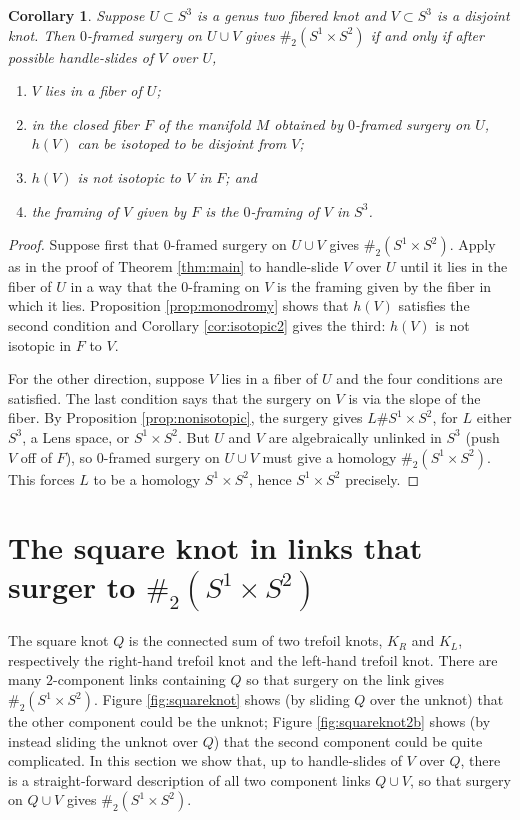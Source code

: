 \documentclass{amsart}
\newtheorem{cor}[thm]{Corollary}
\begin{document}
\begin{cor}  \label{cor:genustwo} Suppose $U \subset S^3$ is a genus two fibered knot and $V \subset S^3$ is a disjoint knot.  Then $0$-framed surgery on $U \cup V$ gives $\#_{2} (S^{1} \times S^{2})$  if and only if  after possible handle-slides of $V$ over $U$,
\begin{enumerate}
\item $V$ lies in a fiber of $U$;
\item in the closed fiber $F$ of the manifold $M$ obtained by $0$-framed surgery on $U$, $h(V)$ can be isotoped to be disjoint from $V$;
\item $h(V)$ is not isotopic to $V$ in $F$; and
\item the framing of $V$ given by $F$ is the $0$-framing of $V$ in $S^3$.
\end{enumerate}
\end{cor}

\begin{proof}  Suppose first that $0$-framed surgery on $U \cup V$ gives $\#_{2} (S^{1} \times S^{2})$.  Apply  \cite[Corollary 4.2]{ST} as in the proof of Theorem \ref{thm:main} to handle-slide $V$ over $U$ until it lies in the fiber of $U$ in a way that the $0$-framing on $V$ is the framing given by the fiber in which it lies.  Proposition \ref{prop:monodromy} shows that $h(V)$ satisfies the second condition and Corollary \ref{cor:isotopic2} gives the third: $h(V)$ is not isotopic in $F$ to $V$.

For the other direction, suppose $V$ lies in a fiber of $U$ and the four conditions are satisfied.  The last condition says that the surgery on $V$ is via the slope of the fiber.  By Proposition \ref{prop:nonisotopic}, the surgery gives $L \# S^1 \times S^2$, for $L$ either $S^3$, a Lens space, or $S^1 \times S^2$.  But $U$ and $V$ are algebraically unlinked in $S^3$ (push $V$ off of $F$), so $0$-framed surgery on $U \cup V$ must give a homology $\#_{2} (S^{1} \times S^{2})$.  This forces $L$ to be a homology $S^1 \times S^2$, hence $S^1 \times S^2$ precisely. \end{proof}

\section{The square knot in links that surger to $\#_{2} (S^{1} \times S^{2})$} \label{sect:squareknot}

The square knot $Q$ is the connected sum of two trefoil knots, $K_R$ and $K_L$, respectively the right-hand trefoil knot and the left-hand trefoil knot.   There are many $2$-component links containing $Q$ so that surgery on the link gives $\#_{2} (S^{1} \times S^{2})$.  Figure \ref{fig:squareknot} shows (by sliding $Q$ over the unknot) that the other component could be the unknot; Figure \ref{fig:squareknot2b} shows (by instead sliding the unknot over $Q$) that the second component could be quite complicated.  In this section we show that, up to handle-slides of $V$ over $Q$, there is a straight-forward description of all two component links $Q \cup V$, so that surgery on $Q \cup V$ gives $\#_{2} (S^{1} \times S^{2})$.
\end{document}
